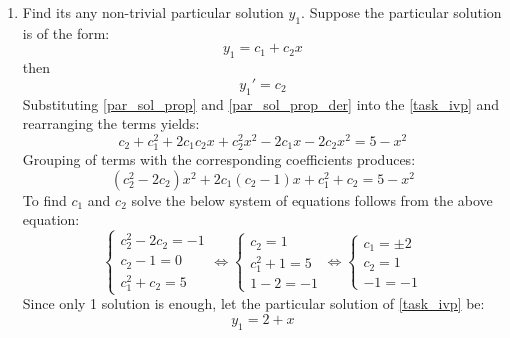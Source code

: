 \documentclass[12pt,a4paper,titlepage,twoside]{article}
\begin{document}
  \begin{enumerate}
    \item Find its any non-trivial particular solution $y_1$. Suppose the particular solution is of the form: 
    \begin{equation} \label{par_sol_prop}
      y_1 = c_1 + c_2 x
    \end{equation}
    then
    \begin{equation} \label{par_sol_prop_der}
      y_1' = c_2
    \end{equation}
    Substituting \eqref{par_sol_prop} and \eqref{par_sol_prop_der} into the \eqref{task_ivp} and rearranging the terms yields:
    \begin{equation*}
      c_2 + c_1^2 + 2c_1c_2x + c_2^2 x^2 - 2c_1x - 2c_2 x^2 = 5 - x^2
    \end{equation*}
    Grouping of terms with the corresponding coefficients produces:
    \begin{equation*}
      (c_2^2 - 2c_2)x^2 + 2c_1(c_2 - 1)x + c_1^2 + c_2 = 5 - x^2
    \end{equation*}
    To find $c_1$ and $c_2$ solve the below system of equations follows from the above equation:
    \begin{equation*}
      \begin{cases}
        c_2^2 - 2c_2 = -1\\
        c_2 - 1 = 0\\
        c_1^2 + c_2 = 5
      \end{cases}
      \iff
      \begin{cases}
        c_2 = 1\\
        c_1^2 + 1 = 5\\
        1 - 2 = -1
      \end{cases}
      \iff
      \begin{cases}
        c_1 = \pm 2\\
        c_2 = 1\\
        -1 = -1
      \end{cases}
    \end{equation*}
    Since only 1 solution is enough, let the particular solution of \eqref{task_ivp} be:
    \begin{equation} \label{par_sol}
      y_1 = 2 + x
    \end{equation}


\end{enumerate}
\end{document}
